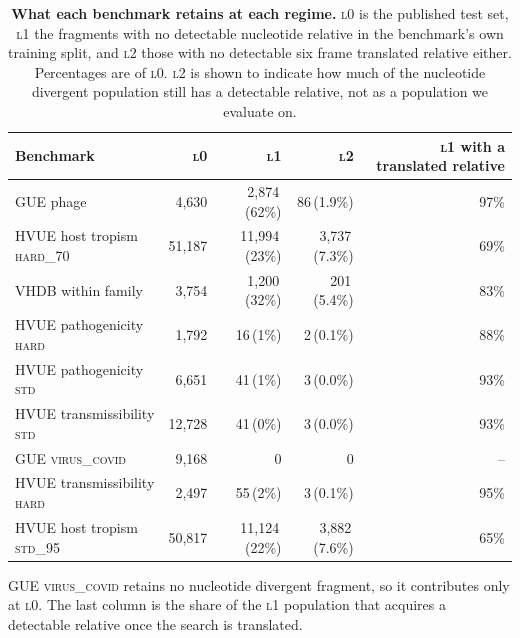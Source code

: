 \begingroup\footnotesize\setlength{\tabcolsep}{5pt}
\begin{table}[htbp]\centering
\caption{\textbf{What each benchmark retains at each regime.} \textsc{l0} is the published test set, \textsc{l1} the fragments with no detectable nucleotide relative in the benchmark's own training split, and \textsc{l2} those with no detectable six frame translated relative either. Percentages are of \textsc{l0}. \textsc{l2} is shown to indicate how much of the nucleotide divergent population still has a detectable relative, not as a population we evaluate on.}
\label{tab:benchmarks}
\begin{tabular}{l rrr r}
\toprule
Benchmark & \textsc{l0} & \textsc{l1} & \textsc{l2} & \textsc{l1} with a translated relative \\
\midrule
GUE phage & 4,630 & 2,874\,(62\%) & 86\,(1.9\%) & 97\% \\
HVUE host tropism \textsc{hard\_70} & 51,187 & 11,994\,(23\%) & 3,737\,(7.3\%) & 69\% \\
VHDB within family & 3,754 & 1,200\,(32\%) & 201\,(5.4\%) & 83\% \\
HVUE pathogenicity \textsc{hard} & 1,792 & 16\,(1\%) & 2\,(0.1\%) & 88\% \\
HVUE pathogenicity \textsc{std} & 6,651 & 41\,(1\%) & 3\,(0.0\%) & 93\% \\
HVUE transmissibility \textsc{std} & 12,728 & 41\,(0\%) & 3\,(0.0\%) & 93\% \\
GUE \textsc{virus\_covid} & 9,168 & 0 & 0 & -- \\
HVUE transmissibility \textsc{hard} & 2,497 & 55\,(2\%) & 3\,(0.1\%) & 95\% \\
HVUE host tropism \textsc{std\_95} & 50,817 & 11,124\,(22\%) & 3,882\,(7.6\%) & 65\% \\
\bottomrule
\end{tabular}
\vspace{3pt}\par\parbox{\textwidth}{\footnotesize GUE \textsc{virus\_covid} retains no nucleotide divergent fragment, so it contributes only at \textsc{l0}. The last column is the share of the \textsc{l1} population that acquires a detectable relative once the search is translated.}
\end{table}\endgroup
